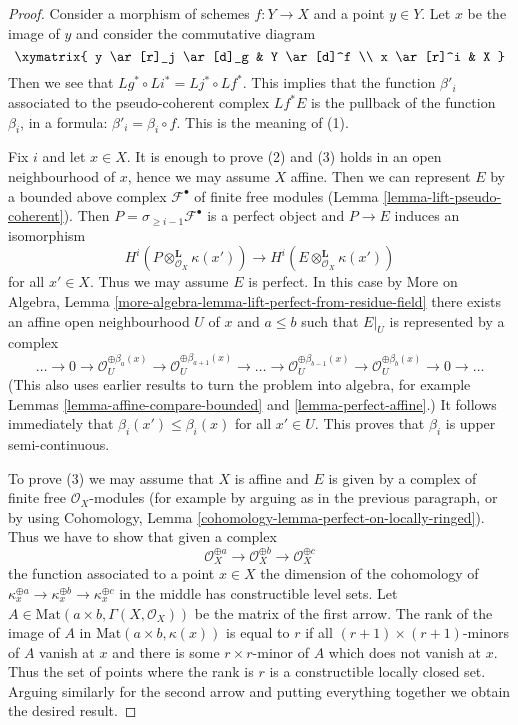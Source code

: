 \begin{proof}
Consider a morphism of schemes $f : Y \to X$ and a point $y \in Y$.
Let $x$ be the image of $y$ and consider the commutative diagram
$$
\xymatrix{
y \ar[r]_j \ar[d]_g & Y \ar[d]^f \\
x \ar[r]^i & X
}
$$
Then we see that $Lg^* \circ Li^* = Lj^* \circ Lf^*$. This implies that
the function $\beta'_i$ associated to the pseudo-coherent complex $Lf^*E$
is the pullback of the function $\beta_i$, in a formula:
$\beta'_i = \beta_i \circ f$. This is the meaning of (1).

\medskip\noindent
Fix $i$ and let $x \in X$. It is enough to prove (2) and (3)
holds in an open neighbourhood of $x$, hence we may assume $X$ affine.
Then we can represent $E$ by a bounded above complex $\mathcal{F}^\bullet$
of finite free modules (Lemma \ref{lemma-lift-pseudo-coherent}).
Then $P = \sigma_{\geq i - 1}\mathcal{F}^\bullet$ is a perfect object
and $P \to E$ induces an isomorphism
$$
H^i(P \otimes_{\mathcal{O}_X}^\mathbf{L} \kappa(x')) \to
H^i(E \otimes_{\mathcal{O}_X}^\mathbf{L} \kappa(x'))
$$
for all $x' \in X$. Thus we may assume $E$ is perfect. In this case
by More on Algebra, Lemma
\ref{more-algebra-lemma-lift-perfect-from-residue-field}
there exists an affine open neighbourhood $U$ of $x$ and
$a \leq b$ such that $E|_U$ is represented by a complex
$$
\ldots \to 0 \to \mathcal{O}_U^{\oplus \beta_a(x)}
\to \mathcal{O}_U^{\oplus \beta_{a + 1}(x)} \to
\ldots \to
\mathcal{O}_U^{\oplus \beta_{b - 1}(x)} \to
\mathcal{O}_U^{\oplus \beta_b(x)} \to 0
\to \ldots
$$
(This also uses earlier results to turn the problem into algebra, for example
Lemmas \ref{lemma-affine-compare-bounded} and
\ref{lemma-perfect-affine}.)
It follows immediately that $\beta_i(x') \leq \beta_i(x)$
for all $x' \in U$. This proves that $\beta_i$ is upper
semi-continuous.

\medskip\noindent
To prove (3) we may assume that $X$ is affine and
$E$ is given by a complex of finite
free $\mathcal{O}_X$-modules (for example by arguing as in the previous
paragraph, or by using Cohomology, Lemma
\ref{cohomology-lemma-perfect-on-locally-ringed}).
Thus we have to show that given a complex
$$
\mathcal{O}_X^{\oplus a} \to
\mathcal{O}_X^{\oplus b} \to
\mathcal{O}_X^{\oplus c}
$$
the function associated to a point $x \in X$ the dimension of the cohomology
of $\kappa_x^{\oplus a} \to \kappa_x^{\oplus b} \to \kappa_x^{\oplus c}$
in the middle has constructible level sets. Let
$A \in \text{Mat}(a \times b, \Gamma(X, \mathcal{O}_X))$ be the matrix
of the first arrow. The rank of the image of $A$ in
$\text{Mat}(a \times b, \kappa(x))$ is equal to $r$ if all
$(r + 1) \times (r + 1)$-minors of $A$ vanish at $x$ and there is some
$r \times r$-minor of $A$ which does not vanish at $x$. Thus the set
of points where the rank is $r$ is a constructible locally closed set.
Arguing similarly for the second arrow and putting everything together
we obtain the desired result.
\end{proof}

